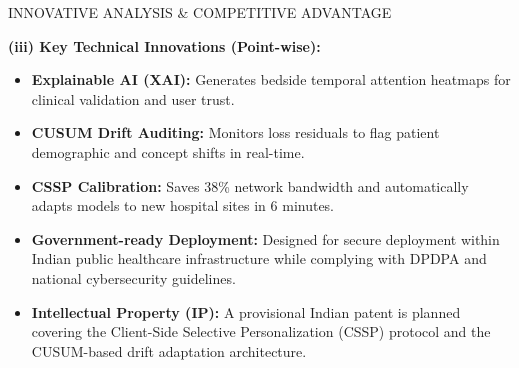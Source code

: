 \documentclass[11pt, a4paper]{article}
\begin{document}
\vspace{0.6cm}

{\Large\color{sectionBlue} INNOVATIVE ANALYSIS \& COMPETITIVE ADVANTAGE}
\vspace{0.2cm}

\textbf{(iii) Key Technical Innovations (Point-wise):}
\begin{itemize}
    \item \textbf{Explainable AI (XAI):} Generates bedside temporal attention heatmaps for clinical validation and user trust.
    \item \textbf{CUSUM Drift Auditing:} Monitors loss residuals to flag patient demographic and concept shifts in real-time.
    \item \textbf{CSSP Calibration:} Saves 38\% network bandwidth and automatically adapts models to new hospital sites in 6 minutes.
    \item \textbf{Government-ready Deployment:} Designed for secure deployment within Indian public healthcare infrastructure while complying with DPDPA and national cybersecurity guidelines.
    \item \textbf{Intellectual Property (IP):} A provisional Indian patent is planned covering the Client-Side Selective Personalization (CSSP) protocol and the CUSUM-based drift adaptation architecture.
\end{itemize}
\end{document}
